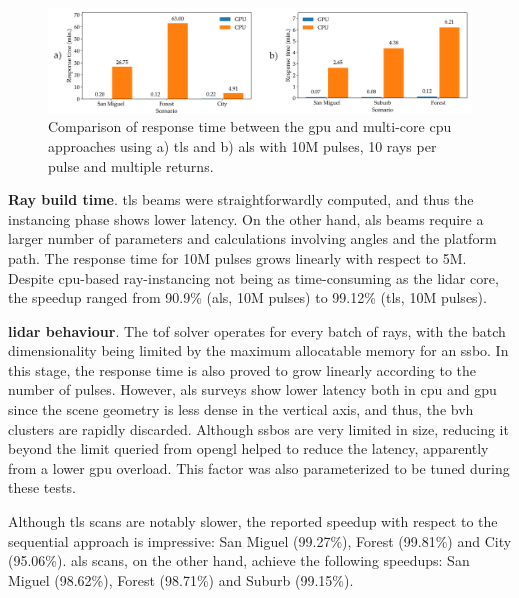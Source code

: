 \begin{figure} [ht]
	\centering
	\includegraphics[width=\linewidth]{figs/lidar_simulation/response_time.png}
	\caption{Comparison of response time between the \acrshort{gpu} and multi-core \acrshort{cpu} approaches using a) \acrshort{tls} and b) \acrshort{als} with 10M pulses, 10 rays per pulse and multiple returns. }
	\label{fig:lidar_response_time_global}
\end{figure}

\textbf{Ray build time}. \acrshort{tls} beams were straightforwardly computed, and thus the instancing phase shows lower latency. On the other hand, \acrshort{als} beams require a larger number of parameters and calculations involving angles and the platform path. The response time for 10M pulses grows linearly with respect to 5M. Despite \acrshort{cpu}-based ray-instancing not being as time-consuming as the \acrshort{lidar} core, the speedup ranged from 90.9\% (\acrshort{als}, 10M pulses) to 99.12\% (\acrshort{tls}, 10M pulses).

\textbf{\acrshort{lidar} behaviour}. The \acrshort{tof} solver operates for every batch of rays, with the batch dimensionality being limited by the maximum allocatable memory for an \acrshort{ssbo}. In this stage, the response time is also proved to grow linearly according to the number of pulses. However, \acrshort{als} surveys show lower latency both in \acrshort{cpu} and \acrshort{gpu} since the scene geometry is less dense in the vertical axis, and thus, the \acrshort{bvh} clusters are rapidly discarded. Although \acrshort{ssbo}s are very limited in size, reducing it beyond the limit queried from \acrshort{opengl} helped to reduce the latency, apparently from a lower \acrshort{gpu} overload. This factor was also parameterized to be tuned during these tests.

Although \acrshort{tls} scans are notably slower, the reported speedup with respect to the sequential approach is impressive: San Miguel (99.27\%), Forest (99.81\%) and City (95.06\%). \acrshort{als} scans, on the other hand, achieve the following speedups: San Miguel (98.62\%), Forest (98.71\%) and Suburb (99.15\%).

